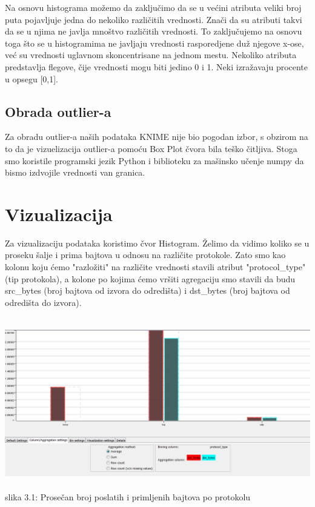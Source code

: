\documentclass[10pt]{article}
\begin{document}
Na osnovu histograma mo\v zemo da zaklju\v cimo da se u ve\' cini atributa veliki broj puta pojavljuje jedna do nekoliko razli\v citih vrednosti. Zna\v ci da su atributi takvi da se u njima ne javlja mno\v stvo razli\v citih vrednosti. To zaklju\v cujemo na osnovu toga \v sto se u histogramima ne javljaju vrednosti rasporedjene du\v z njegove x-ose, ve\' c su vrednosti uglavnom skoncentrisane na jednom mestu. Nekoliko atributa predstavlja flegove, \v cije vrednosti mogu biti jedino 0 i 1. Neki izra\v zavaju procente u opsegu [0,1].

\subsection{Obrada outlier-a}

Za obradu outlier-a na\v sih podataka KNIME nije bio pogodan izbor, s obzirom na to da je vizuelizacija outlier-a pomo\' cu Box Plot \v cvora bila te\v sko \v citljiva. Stoga smo koristile programski jezik Python i biblioteku za ma\v sinsko u\v cenje numpy da bismo izdvojile vrednosti van granica. 

\section{Vizualizacija}

Za vizualizaciju podataka koristimo \v cvor Histogram. \v Zelimo da vidimo koliko se u proseku \v salje i prima bajtova u odnosu na razli\v cite protokole. Zato smo kao kolonu koju \' cemo "razlo\v ziti" na razli\v cite vrednosti stavili atribut "protocol\_type" (tip protokola), a kolone po kojima \' cemo vr\v siti agregaciju smo stavili da budu src\_bytes (broj bajtova od izvora do odredi\v sta) i dst\_bytes (broj bajtova od odredi\v sta do izvora).

\begin{center}
\includegraphics[width = \textwidth,  height = 7.5cm]{vizuelizacija1}
slika 3.1: Prose\v can broj poslatih i primljenih bajtova po protokolu\\
\end{center}
\end{document}
